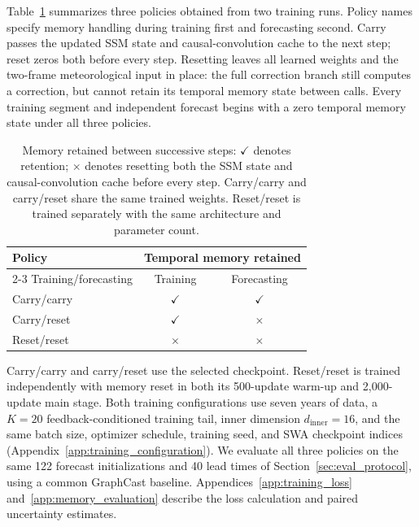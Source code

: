 \documentclass[11pt]{article}
\begin{document}
{Table~\ref{tab:memory_controls} summarizes three policies obtained from two training runs. Policy names specify memory handling during training first and forecasting second. Carry passes the updated SSM state and causal-convolution cache to the next step; reset zeros both before every step. Resetting leaves all learned weights and the two-frame meteorological input in place: the full correction branch still computes a correction, but cannot retain its temporal memory state between calls. Every training segment and independent forecast begins with a zero temporal memory state under all three policies.}

\begin{table}[!htb]
    \centering
    \small
    \begin{tabular}{lcc}
        \toprule
        Policy & \multicolumn{2}{c}{Temporal memory retained} \\
        \cmidrule(lr){2-3}
        Training/forecasting & Training & Forecasting \\
        \midrule
        Carry/carry & $\checkmark$ & $\checkmark$ \\
        Carry/reset & $\checkmark$ & $\times$ \\
        Reset/reset & $\times$ & $\times$ \\
        \bottomrule
    \end{tabular}
    \caption{{Memory retained between successive steps: $\checkmark$ denotes retention; $\times$ denotes resetting both the SSM state and causal-convolution cache before every step. Carry/carry and carry/reset share the same trained weights. Reset/reset is trained separately with the same architecture and parameter count.}}
    \label{tab:memory_controls}
\end{table}

{Carry/carry and carry/reset use the selected checkpoint. Reset/reset is trained independently with memory reset in both its 500-update warm-up and 2,000-update main stage. Both training configurations use seven years of data, a $K=20$ feedback-conditioned training tail, inner dimension $d_{\mathrm{inner}}=16$, and the same batch size, optimizer schedule, training seed, and SWA checkpoint indices (Appendix~\ref{app:training_configuration}).} We evaluate all three policies on the same 122 forecast initializations and 40 lead times of Section~\ref{sec:eval_protocol}, using a common GraphCast baseline. {Appendices~\ref{app:training_loss} and~\ref{app:memory_evaluation} describe the loss calculation and paired uncertainty estimates.}
\end{document}
